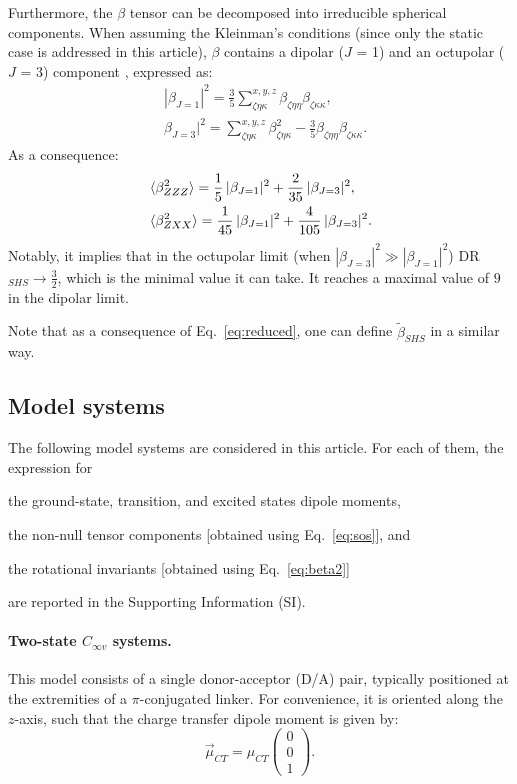 \documentclass[journal=jpcafh]{achemso}
\begin{document}
Furthermore, the $\beta$ tensor can be decomposed into irreducible spherical components\cite{Jerphagnon1978}. When assuming the Kleinman's conditions (since only the static case is addressed in this article), $\beta$ contains a dipolar ($J$ = 1) and an octupolar ($J$ = 3) component \cite{Brasselet1998}, expressed as:\begin{align}
	&|\beta_{J=1}|^2 = \frac{3}{5}\sum_{\zeta\eta\kappa}^{x,y,z} \beta_{\zeta\eta\eta}\beta_{\zeta\kappa\kappa},\nonumber\\
	&\beta_{J=3}|^2 =\sum_{\zeta\eta\kappa}^{x,y,z} \beta_{\zeta\eta\kappa}^2 - \frac{3}{5} \beta_{\zeta\eta\eta}\beta_{\zeta\kappa\kappa}. \label{eq:bj}
\end{align}
As a consequence:\begin{align}
		&\braket{\beta^2_{ZZZ}} =  \frac{1}{5}\,|\beta_{J=1}|^2+\frac{2}{35}\,|\beta_{J=3}|^2,\nonumber\\ &\braket{\beta^2_{ZXX}} = \frac{1}{45}\,|\beta_{J=1}|^2+\frac{4}{105}\,|\beta_{J=3}|^2.\label{eq:beta2}
\end{align}
Notably, it implies that in the octupolar limit (when $|\beta_{J=3}|^2 \gg |\beta_{J=1}|^2$) DR$_{SHS}\to\frac{3}{2}$, which is the minimal value it can take. It reaches a maximal value of $9$ in the dipolar limit.\cite{verbiest_second-order_2009}

Note that as a consequence of Eq.~\eqref{eq:reduced}, one can define $\tilde\beta_{SHS}$ in a similar way.

\subsection{Model systems}

The following model systems are considered in this article. For each of them, the expression for \begin{inparaenum}[i)]
	\item the ground-state, transition, and excited states dipole moments,
	\item the non-null tensor components [obtained using Eq.~\ref{eq:sos}], and
	\item the rotational invariants [obtained using Eq.~\eqref{eq:beta2}]
\end{inparaenum} are reported in the Supporting Information (SI).

\paragraph{Two-state $C_{\infty v}$ systems.}  
This model consists of a single donor-acceptor (D/A) pair, typically positioned at the extremities of a $\pi$-conjugated linker. For convenience, it is oriented along the $z$-axis, such that the charge transfer dipole moment is given by:  
\begin{equation*}
	\vec{\mu}_{CT} = \mu_{CT} \begin{pmatrix} 0 \\ 0 \\ 1 \end{pmatrix}.
\end{equation*}
\end{document}
